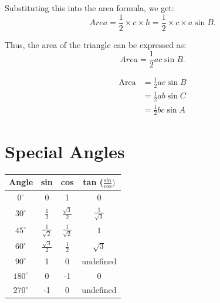 \documentclass[12pt]{article}
\begin{document}
Substituting this into the area formula, we get:
$$Area = \frac{1}{2} \times c \times h = \frac{1}{2} \times c \times a \sin B.$$

Thus, the area of the triangle can be expressed as:
$$Area = \frac{1}{2}ac \sin B.$$

\begin{minipage}{0.45\textwidth}
\centering
{}
\end{minipage}%
\hfill
\begin{minipage}{0.45\textwidth}
\centering
\begin{align*}
\text{Area} &= \frac{1}{2}ac \sin B\\
            &= \frac{1}{2}ab \sin C\\
            &= \frac{1}{2}bc \sin A
\end{align*}
\end{minipage}

\newpage

\section*{Special Angles}
\begin{center}
\begin{Large}
\renewcommand{\arraystretch}{1.6}
\begin{tabular}{c|c|c|c}
Angle & sin & cos & tan ($\frac{\text{sin}}{\text{cos}})$\\
\hline
  $0^\circ$ &  0            & 1                    & 0 \\
 $30^\circ$ & $\frac{1}{2}$ & $\frac{\sqrt{3}}{2}$ & $\frac{1}{\sqrt{3}}$ \\
 $45^\circ$ & $\frac{1}{\sqrt{2}}$ & $\frac{1}{\sqrt{2}}$ & $1$ \\
 $60^\circ$ & $\frac{\sqrt{3}}{2}$ & $\frac{1}{2}$ & $\sqrt{3}$ \\
 $90^\circ$ &  1 &  0 & undefined\\
$180^\circ$ &  0 & -1 & 0 \\
$270^\circ$ & -1 &  0 & undefined
\end{tabular}
\end{Large}
\end{center}
\end{document}
